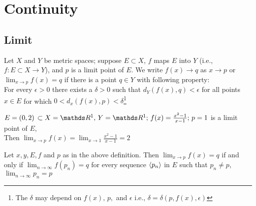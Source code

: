 \documentclass[../main-sheet.tex]{subfiles}
\begin{document}
\chapter{Continuity}
\section{Limit}
\begin{defn}[Limit]
    Let $ X $ and $ Y $ be metric spaces; suppose $ E\subset X $, $ f $ maps $ E $ into $ Y $ (i.e., $ f:E\subset X\to Y $), and $ p $ is a limit point of $ E $. We write $ f(x)\to q $ as $ x\to p $ or $ \lim_{x\to p} f(x)=q$ if there is a point $ q\in Y $ with following property:\\
    For every $ \epsilon> 0$ there exists a $ \delta>0 $ such that $ d_Y(f(x),q)<\epsilon $ for all points $ x\in E $ for which $ 0<d_x(f(x),p)<\delta $\footnote{The $ \delta $ may depend on $ f(x),\,p, $ and $ \epsilon $ i.e., $ \delta=\delta(p,f(x),\epsilon) $} 
\end{defn}
\begin{ex}
    $ E=(0,2)\,\subset X=\R^1,\,Y=\R^1;\,f(x)=\frac{x^2-1}{x-1};\, p=1 $ is a limit point of $ E $,\\Then $ \lim_{x\to p} f(x)= \lim_{x\to 1}\frac{x^2-1}{x-1}=2$
\end{ex}
\begin{thm}
    Let $ x,y,E,f $ and $ p $ as in the above definition. Then $ \lim_{x\to p} f(x)=q $ if and only if $ \lim_{n\to \infty} f(p_n)=q $ for every sequence $ \left<p_n\right> $ in $ E $ such that $ p_n\neq p $, $ \lim_{n\to \infty} p_n=p $
\end{thm}
\end{document}
